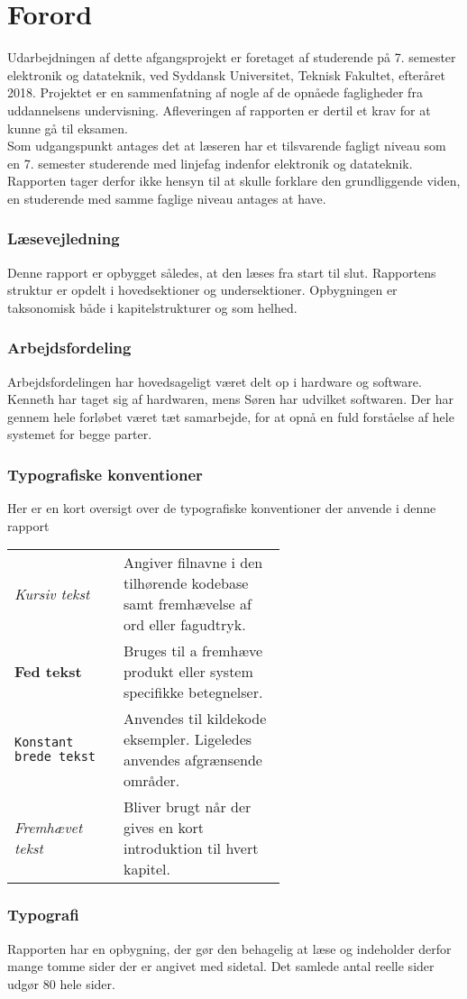 \chapter*{Forord}\label{chap:forord}

Udarbejdningen af dette afgangsprojekt er foretaget af studerende på 7. semester elektronik og datateknik, ved Syddansk Universitet, Teknisk Fakultet, efteråret 2018. Projektet er en sammenfatning af nogle af de opnåede fagligheder fra uddannelsens undervisning. Afleveringen af rapporten er dertil et krav for at kunne gå til eksamen.\\

Som udgangspunkt antages det at læseren har et tilsvarende fagligt niveau som en 7. semester studerende med linjefag indenfor elektronik og datateknik.
Rapporten tager derfor ikke hensyn til at skulle forklare den grundliggende viden, en studerende med samme faglige niveau antages at have.

\subsection{Læsevejledning}
Denne rapport er opbygget således, at den læses fra start til slut. Rapportens struktur er opdelt i hovedsektioner og undersektioner. Opbygningen er taksonomisk både i kapitelstrukturer og som helhed.

\subsection{Arbejdsfordeling}
Arbejdsfordelingen har hovedsageligt været delt op i hardware og software. Kenneth har taget sig af hardwaren, mens Søren har udvilket softwaren. Der har gennem hele forløbet været tæt samarbejde, for at opnå en fuld forståelse af hele systemet for begge parter. 

\subsection{Typografiske konventioner}
Her er en kort oversigt over de typografiske konventioner der anvende i denne rapport\\
\begin{tabular}{l p{0.6\linewidth}}
	\textit{Kursiv tekst}			& Angiver filnavne i den tilhørende kodebase samt fremhævelse af ord eller fagudtryk. \\
	\textbf{Fed tekst}				& Bruges til a fremhæve produkt eller system specifikke betegnelser.\\
	\texttt{Konstant brede tekst}	& Anvendes til kildekode eksempler. Ligeledes anvendes afgrænsende områder.\\
	\emph{Fremhævet tekst}		    & Bliver brugt når der gives en kort introduktion til hvert kapitel.\\
\end{tabular}

\subsection{Typografi}
Rapporten har en opbygning, der gør den behagelig at læse og indeholder derfor mange tomme sider der er angivet med sidetal.
Det samlede antal reelle sider udgør 80 hele sider. 
